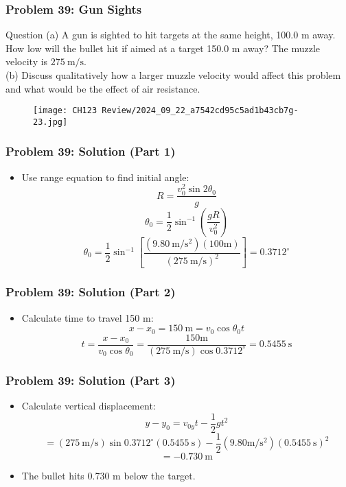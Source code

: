 \documentclass{beamer}
\begin{document}
\begin{frame}
\frametitle{Problem 39: Gun Sights}
\begin{block}{Question}
(a) A gun is sighted to hit targets at the same height, 100.0 m away. How low will the bullet hit if aimed at a target 150.0 m away? The muzzle velocity is $275 \mathrm{~m} / \mathrm{s}$.\\

(b) Discuss qualitatively how a larger muzzle velocity would affect this problem and what would be the effect of air resistance.
\end{block}
\begin{figure}[H]
    \centering
    \texttt{[image: CH123 Review/2024\_09\_22\_a7542cd95c5ad1b43cb7g-23.jpg]}
\end{figure}

\end{frame}

\begin{frame}
\frametitle{Problem 39: Solution (Part 1)}
\begin{itemize}
    \item Use range equation to find initial angle:
    $$R=\frac{v_{0}^{2} \sin 2 \theta_{0}}{g}$$
    $$\theta_{0}=\frac{1}{2} \sin ^{-1}\left(\frac{g R}{v_{0}^{2}}\right)$$
    $$\theta_{0}=\frac{1}{2} \sin ^{-1}\left[\frac{\left(9.80 \mathrm{~m} / \mathrm{s}^{2}\right)(100 \mathrm{m})}{(275 \mathrm{~m} / \mathrm{s})^{2}}\right]=0.3712^{\circ}$$
\end{itemize}
\end{frame}

\begin{frame}
\frametitle{Problem 39: Solution (Part 2)}
\begin{itemize}
    \item Calculate time to travel 150 m:
    $$x-x_{0}=150 \mathrm{~m}=v_{0} \cos \theta_{0} t$$
    $$t=\frac{x-x_{0}}{v_{0} \cos \theta_{0}}=\frac{150 \mathrm{m}}{(275 \mathrm{~m} / \mathrm{s}) \cos 0.3712^{\circ}}=0.5455 \mathrm{~s}$$
\end{itemize}
\end{frame}

\begin{frame}
\frametitle{Problem 39: Solution (Part 3)}
\begin{itemize}
    \item Calculate vertical displacement:
    $$y-y_{0}=v_{0y} t-\frac{1}{2} g t^{2}$$
    $$=(275 \mathrm{~m} / \mathrm{s}) \sin 0.3712^{\circ}(0.5455 \mathrm{~s})-\frac{1}{2}(9.80 \mathrm{m} / \mathrm{s}^{2})(0.5455 \mathrm{~s})^2$$
    $$=-0.730 \mathrm{~m}$$
    \item The bullet hits 0.730 m below the target.
\end{itemize}
\end{frame}
\end{document}
